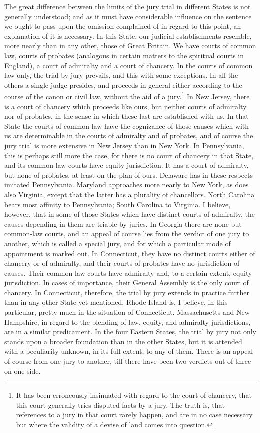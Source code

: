 The great difference between the limits of the jury trial in different States is not generally understood; and as it must have considerable influence on the sentence we ought to pass upon the omission complained of in regard to this point, an explanation of it is necessary. 
In this State, our judicial establishments resemble, more nearly than in any other, those of Great Britain. 
We have courts of common law, courts of probates (analogous in certain matters to the spiritual courts in England), a court of admiralty and a court of chancery. 
In the courts of common law only, the trial by jury prevails, and this with some exceptions. 
In all the others a single judge presides, and proceeds in general either according to the course of the canon or civil law, without the aid of a jury.\footnote{It has been erroneously insinuated with regard to the court of chancery, that this court generally tries disputed facts by a jury. 
The truth is, that references to a jury in that court rarely happen, and are in no case necessary but where the validity of a devise of land comes into question.} In New Jersey, there is a court of chancery which proceeds like ours, but neither courts of admiralty nor of probates, in the sense in which these last are established with us. 
In that State the courts of common law have the cognizance of those causes which with us are determinable in the courts of admiralty and of probates, and of course the jury trial is more extensive in New Jersey than in New York. 
In Pennsylvania, this is perhaps still more the case, for there is no court of chancery in that State, and its common-law courts have equity jurisdiction. 
It has a court of admiralty, but none of probates, at least on the plan of ours. 
Delaware has in these respects imitated Pennsylvania. 
Maryland approaches more nearly to New York, as does also Virginia, except that the latter has a plurality of chancellors. 
North Carolina bears most affinity to Pennsylvania; South Carolina to Virginia. 
I believe, however, that in some of those States which have distinct courts of admiralty, the causes depending in them are triable by juries. 
In Georgia there are none but common-law courts, and an appeal of course lies from the verdict of one jury to another, which is called a special jury, and for which a particular mode of appointment is marked out. 
In Connecticut, they have no distinct courts either of chancery or of admiralty, and their courts of probates have no jurisdiction of causes. 
Their common-law courts have admiralty and, to a certain extent, equity jurisdiction. 
In cases of importance, their General Assembly is the only court of chancery. 
In Connecticut, therefore, the trial by jury extends in practice further than in any other State yet mentioned. 
Rhode Island is, I believe, in this particular, pretty much in the situation of Connecticut. 
Massachusetts and New Hampshire, in regard to the blending of law, equity, and admiralty jurisdictions, are in a similar predicament. 
In the four Eastern States, the trial by jury not only stands upon a broader foundation than in the other States, but it is attended with a peculiarity unknown, in its full extent, to any of them. 
There is an appeal of course from one jury to another, till there have been two verdicts out of three on one side.

